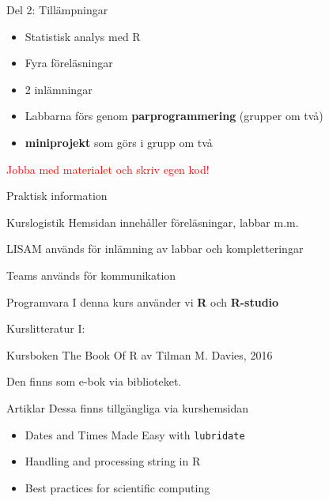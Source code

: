 \documentclass[
  10pt,
  ignorenonframetext,
]{beamer}
\providecommand{\tightlist}{%
  \setlength{\itemsep}{0pt}\setlength{\parskip}{0pt}}
\begin{document}
\begin{frame}{Del 2: Tillämpningar}
\protect\hypertarget{del-2-tilluxe4mpningar}{}
\begin{itemize}
\tightlist
\item
  Statistisk analys med R
\item
  Fyra föreläsningar
\item
  2 inlämningar
\item
  Labbarna förs genom \textbf{parprogrammering} (grupper om två)
\item
  \textbf{miniprojekt} som görs i grupp om två
\end{itemize}

\pause

\textcolor{red}{Jobba med materialet och skriv egen kod!}
\end{frame}

\begin{frame}{Praktisk information}
\protect\hypertarget{praktisk-information}{}
\begin{block}{Kurslogistik}
\protect\hypertarget{kurslogistik}{}
Hemsidan innehåller föreläsningar, labbar m.m.

LISAM används för inlämning av labbar och kompletteringar

Teams används för kommunikation
\end{block}

\begin{block}{Programvara}
\protect\hypertarget{programvara}{}
I denna kurs använder vi \textbf{R} och \textbf{R-studio}
\end{block}
\end{frame}

\begin{frame}{Kurslitteratur I:}
\protect\hypertarget{kurslitteratur-i}{}
\begin{block}{Kursboken}
\protect\hypertarget{kursboken}{}
The Book Of R av Tilman M. Davies, 2016

Den finns som e-bok via biblioteket.
\end{block}

\begin{block}{Artiklar}
\protect\hypertarget{artiklar}{}
Dessa finns tillgängliga via kurshemsidan

\begin{itemize}
\tightlist
\item
  Dates and Times Made Easy with \texttt{lubridate}
\item
  Handling and processing string in R
\item
  Best practices for scientific computing
\end{itemize}
\end{block}
\end{frame}
\end{document}
